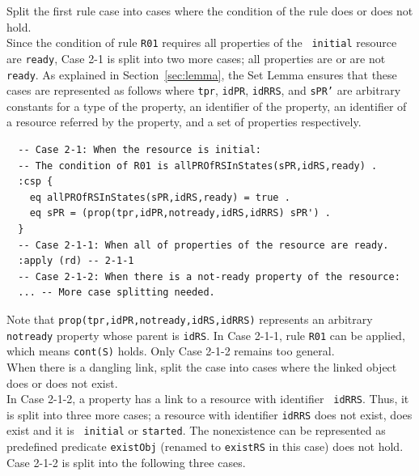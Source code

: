 \documentclass[12pt]{report}
\newcommand{\stt}[1]{{\small{\tt {#1}}}}
\begin{document}
 Split the first rule case into cases where
the condition of the rule does or does not hold. \\ Since the
condition of rule {\tt R01} requires all properties of the {\tt
  initial} resource are {\tt ready}, Case 2-1 is split into two more
cases; all properties are or are not {\tt ready}. As explained in
Section~\ref{sec:lemma}, the Set Lemma ensures that these cases are
represented as follows where {\tt tpr}, {\tt idPR}, {\tt idRRS}, and
{\tt sPR'} are arbitrary constants for a type of the property, an
identifier of the property, an identifier of a resource referred by
the property, and a set of properties respectively. 
\begin{verbatim}
  -- Case 2-1: When the resource is initial:
  -- The condition of R01 is allPROfRSInStates(sPR,idRS,ready) .
  :csp { 
    eq allPROfRSInStates(sPR,idRS,ready) = true .
    eq sPR = (prop(tpr,idPR,notready,idRS,idRRS) sPR') .
  }
  -- Case 2-1-1: When all of properties of the resource are ready.
  :apply (rd) -- 2-1-1
  -- Case 2-1-2: When there is a not-ready property of the resource:
  ... -- More case splitting needed.
\end{verbatim}
Note that \stt{prop(tpr,idPR,notready,idRS,idRRS)} represents an
arbitrary {\tt notready} property whose parent is {\tt idRS}. In Case
2-1-1, rule {\tt R01} can be applied, which means \stt{cont(S)} holds. Only
Case 2-1-2 remains too general.\\

 When there is a dangling link, split the case
into cases where the linked object does or does not exist. \\ In Case
2-1-2, a property has a link to a resource with identifier {\tt
  idRRS}. Thus, it is split into three more cases; a resource with
identifier {\tt idRRS} does not exist, does exist and it is {\tt
  initial} or {\tt started}. The nonexistence can be represented as
predefined predicate {\tt existObj} (renamed to {\tt existRS} in this
case) does not hold. Case 2-1-2 is split into the following three
cases.
\end{document}
